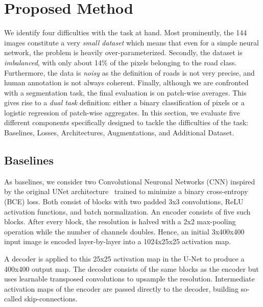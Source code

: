 \documentclass[10pt,conference,compsocconf]{IEEEtran}
\begin{document}
\section{Proposed Method}
We identify four difficulties with the task at hand. Most prominently, the 144 images constitute a very \emph{small dataset} which means that even for a simple neural network, the problem is heavily over-parameterized. Secondly, the dataset is \emph{imbalanced}, with only about 14\% of the pixels belonging to the road class. Furthermore, the data is \emph{noisy} as the definition of roads is not very precise, and human annotation is not always coherent. Finally, although we are confronted with a segmentation task, the final evaluation is on patch-wise averages. This gives rise to a \emph{dual task} definition: either a binary classification of pixels or a logistic regression of patch-wise aggregates. In this section, we evaluate five different components specifically designed to tackle the difficulties of the task: Baselines, Losses, Architectures, Augmentations, and Additional Dataset.

\subsection{Baselines}
As baselines, we consider two Convolutional Neuronal Networks (CNN) inspired by the original UNet architecture~\cite{unet} trained to minimize a binary cross-entropy (BCE) loss. Both consist of blocks with two padded 3x3 convolutions, ReLU activation functions, and batch normalization. An encoder consists of five such blocks. After every block, the resolution is halved with a 2x2 max-pooling operation while the number of channels doubles. Hence, an initial 3x400x400 input image is encoded layer-by-layer into a 1024x25x25 activation map.\

A decoder is applied to this 25x25 activation map in the U-Net to produce a 400x400 output map. The decoder consists of the same blocks as the encoder but uses learnable transposed convolutions to upsample the resolution. Intermediate activation maps of the encoder are passed directly to the decoder, building so-called skip-connections.\
\end{document}
